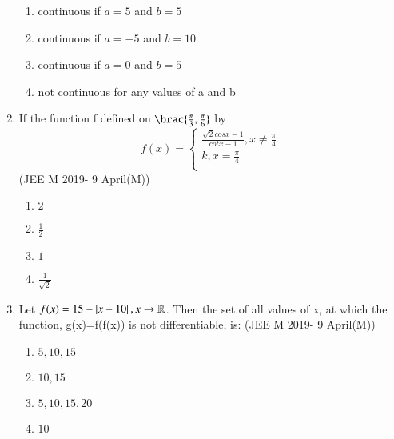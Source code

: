 \documentclass[journal,12pt,twocolumn]{IEEEtran}
\theoremstyle{remark}
\begin{document}
\begin{enumerate}
	\begin{enumerate}[label=(\alph*)]
		\item continuous if $a=5$ and $b=5$
		\item continuous if $a=-5$ and $b=10$
		\item continuous if $a=0$ and $b=5$
		\item not continuous for any values of a and b
	\end{enumerate}
\item If the function f defined on $ \brac{ \frac{\pi}{3}, \frac{\pi}{6}}$ by
	\begin{equation}
	    f(x)= 
	    \begin{cases}
	    \frac{\sqrt{2} cosx-1}{cotx-1}, x \ne \frac{\pi}{4}\\
	    k, x = \frac{\pi}{4}\\
	    \end{cases}
	\end{equation}
	\hfill{(JEE M 2019- 9 April(M))}
	\begin{enumerate}[label=(\alph*)]
		\item $2$
		\item $\frac{1}{2}$
		\item $1$
		\item $\frac{1}{\sqrt{2}}$
	\end{enumerate}
\item Let $f(x)= 15-\left\vert x-10\right\vert, x\to\mathbb{R}$. Then the set of all values of x, at which the function, g(x)=f(f(x)) is not differentiable, is:
	\hfill{(JEE M 2019- 9 April(M))}
	\begin{enumerate}[label=(\alph*)]
		\item ${5,10,15}$
		\item ${10,15}$
		\item ${5,10,15,20}$
		\item ${10}$
	\end{enumerate}
\end{enumerate}
\end{document}

